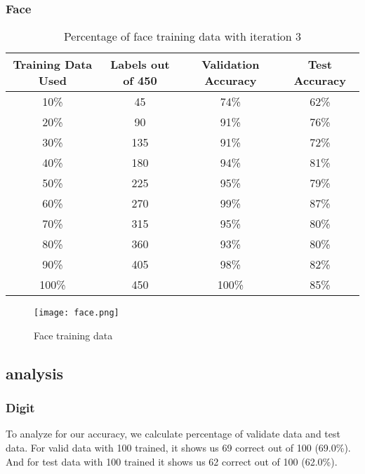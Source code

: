 \documentclass{article}
\begin{document}
        \subsubsection{Face}
            \begin{table}[h]
                \centering
                \begin{tabular}{c|c|c|c}
                    \hline
                        Training Data Used & Labels out of 450 & Validation Accuracy & Test Accuracy \\
                    \hline
                        10\% & 45 & 74\% & 62\%\\
                    \hline
                        20\% & 90 & 91\% & 76\%\\
                    \hline
                        30\% & 135 & 91\% & 72\%\\
                    \hline
                        40\% & 180 & 94\% & 81\%\\
                    \hline
                        50\% & 225 & 95\% & 79\%\\
                    \hline
                        60\% & 270 & 99\% & 87\%\\
                    \hline
                        70\% & 315 & 95\% & 80\%\\
                    \hline
                        80\% & 360 & 93\% & 80\%\\
                    \hline
                        90\% & 405 & 98\% & 82\%\\
                    \hline
                        100\% & 450 & 100\% & 85\%\\
                    \hline
                \end{tabular}
                \caption{Percentage of face training data with iteration 3}
            \end{table}
            
            \begin{figure}[h]
                \centering
                \texttt{[image: face.png]}
                \caption{Face training data}
            \end{figure}
        \newpage
    \subsection{analysis}
        \subsubsection{Digit}
            To analyze for our accuracy, we calculate percentage of validate data and test data. \newline
            For valid data with 100 trained, it shows us 69 correct out of 100 (69.0\%). And for test data with 100 trained it shows us 62 correct out of 100 (62.0\%).
\end{document}
